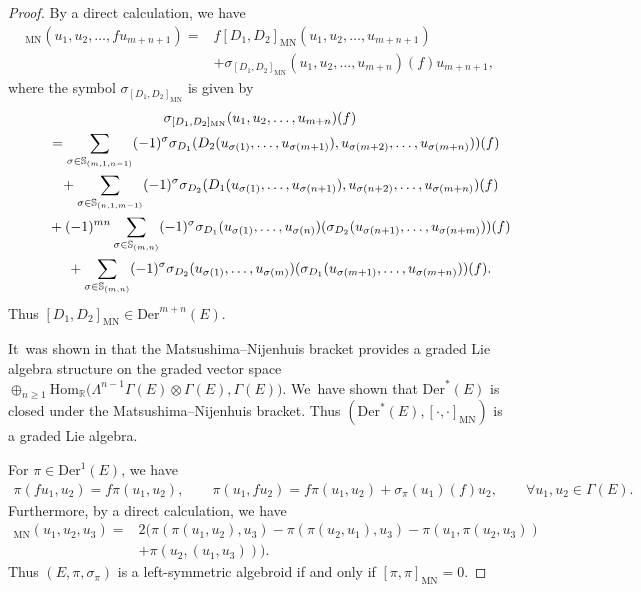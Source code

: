 \documentclass[10pt,a4paper]{amsart}
\numberwithin{equation}{section}
\newcommand{\Real}{\mathbb R}
\newcommand{\Hom}{\mathrm{Hom}}
\newcommand{\Der}{\mathrm{Der}}
\newcommand{\MN}{\mathrm{MN}}
\begin{document}
\begin{proof}
By a direct calculation, we have
\begin{align*}
[D_1,D_2]_{\MN}(u_1,u_2,\dots,fu_{m+n+1})={}&f[D_1,D_2]_{\MN}(u_1,u_2,\dots,u_{m+n+1})
\\
&+\sigma_{[D_1,D_2]_{\MN}}(u_1,u_2,\dots,u_{m+n})(f)u_{m+n+1},
\end{align*}
where the symbol $\sigma_{[D_1,D_2]_{\MN}}$ is given by
\begin{gather*}
\sigma_{[D_1,D_2]_{\MN}}(u_1,u_2,\dots,u_{m+n})(f)
\\ \qquad
{}=\sum_{\sigma\in \mathbb{S}_{(m,1,n-1)}}(-1)^{\sigma}\sigma _{D_{1}}(D_{2}(u_{\sigma(1)},\dots,u_{\sigma(m+1)}),u_{\sigma(m+2)},\dots,u_{\sigma(m+n)}))(f)
\\ \qquad\hphantom{=}
{}+\sum_{\sigma\in \mathbb{S}_{(n,1,m-1)}}(-1)^{\sigma}\sigma_{D_{2}} (D_{1}(u_{\sigma(1)},\dots,u_{\sigma(n+1)}),u_{\sigma(n+2)},\dots,u_{\sigma(m+n)})(f)
\\ \qquad\hphantom{=}
{}+(-1)^{mn}\sum_{\sigma\in \mathbb{S}_{(m,n)}}(-1)^{\sigma}\sigma _{D_{1}}(u_{\sigma(1)},\dots,u_{\sigma(n)})(\sigma _{D_{2}}(u_{\sigma(n+1)},\dots,u_{\sigma(n+m)}))(f)
\\ \qquad\hphantom{=}
{}+\sum_{\sigma\in \mathbb{S}_{(m,n)}}(-1)^{\sigma}\sigma _{D_{2}}(u_{\sigma(1)},\dots,u_{\sigma(m)})(\sigma _{D_{1}}(u_{\sigma(m+1)},\dots,u_{\sigma(m+n)}))(f).
\end{gather*}
Thus $[D_1,D_2]_{\MN}\in\Der^{m+n}(E)$.

It~was shown in \cite{ChaLiv,Nijenhuis} that the Matsushima--Nijenhuis bracket provides a graded Lie algebra structure on the graded vector space $\oplus_{n\geq 1}\Hom_\Real\big(\Lambda^{n-1}\Gamma(E)\otimes\Gamma(E),\Gamma(E)\big)$. We~have shown that $\Der^*(E)$ is closed under the Matsushima--Nijenhuis bracket. Thus $(\Der^*(E),[\cdot,\cdot]_{\MN})$ is a graded Lie algebra.

For $\pi\in\Der^1(E)$, we have
\begin{gather*}
 \pi(fu_1,u_2)=f\pi(u_1,u_2),\qquad
 \pi(u_1,fu_2)=f\pi(u_1,u_2)+\sigma_\pi(u_1)(f)u_2,\qquad
 \forall u_1,u_2\in\Gamma(E).
\end{gather*}
Furthermore, by a direct calculation, we have
\begin{align*}
[\pi,\pi]_{\MN}(u_1,u_2,u_3)={}&2(\pi(\pi(u_1,u_2),u_3)-\pi(\pi(u_2,u_1),u_3)-\pi(u_1,\pi(u_2,u_3))
\\
&+\pi(u_2,(u_1,u_3))).
\end{align*}
Thus $(E,\pi,\sigma_\pi)$ is a left-symmetric algebroid if and only if $[\pi,\pi]_{\MN}=0$.
\end{proof}
\end{document}
